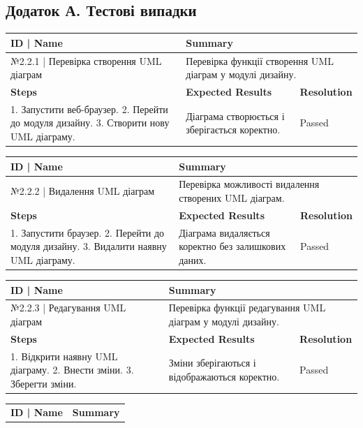 \documentclass[oneside,14pt]{extarticle}
\begin{document}
\begin{normalsize}
	\section*{Додаток А. Тестові випадки}
	\begin{longtable}{|p{7cm}|p{3.5cm}|p{3.5cm}|} 
		\hline \textbf{ID | Name} &\multicolumn{2}{|p{7cm}|}{\textbf{Summary}} 
		\\\hline 
		№2.2.1 | Перевірка створення UML діаграм & \multicolumn{2}{|p{7cm}|}{Перевірка функції створення UML діаграм у модулі
			дизайну.}
		\\ \hline \textbf{Steps} & \textbf{Expected Results} & \textbf{Resolution} \\ \hline
		1. Запустити веб-браузер. 2. Перейти до модуля дизайну. 3. Створити нову UML діаграму.
		& Діаграма створюється і зберігається коректно. & Passed \\ \hline \end{longtable}
		\begin{longtable}{|p{7cm}|p{3.5cm}|p{3.5cm}|} 
		\hline \textbf{ID | Name} &\multicolumn{2}{|p{7cm}|}{\textbf{Summary}} 
		\\\hline №2.2.2 | Видалення
		UML діаграм & \multicolumn{2}{|p{7cm}|}{Перевірка можливості видалення
			створених UML діаграм.} \\ \hline \textbf{Steps} & \textbf{Expected Results} & \textbf{Resolution} \\ \hline1. Запустити браузер. 2. Перейти до модуля
		дизайну. 3. Видалити наявну UML діаграму. & Діаграма видаляється коректно без
		залишкових даних. & Passed \\ \hline \end{longtable}
		\begin{longtable}{|p{7cm}|p{3.5cm}|p{3.5cm}|} 
		\hline \textbf{ID | Name} &\multicolumn{2}{|p{7cm}|}{\textbf{Summary}} 
		\\\hline №2.2.3 | Редагування UML діаграм & \multicolumn{2}{|p{7cm}|}{Перевірка
			функції редагування UML діаграм у модулі дизайну.} \\ \hline \textbf{Steps} & \textbf{Expected Results} & \textbf{Resolution} \\ \hline1. Відкрити наявну
		UML діаграму. 2. Внести зміни. 3. Зберегти зміни. & Зміни зберігаються і
		відображаються коректно. & Passed \\ \hline \end{longtable}
		\begin{longtable}{|p{7cm}|p{3.5cm}|p{3.5cm}|} 
		\hline \textbf{ID | Name} &\multicolumn{2}{|p{7cm}|}{\textbf{Summary}} 

\end{longtable}
\end{normalsize}
\end{document}

